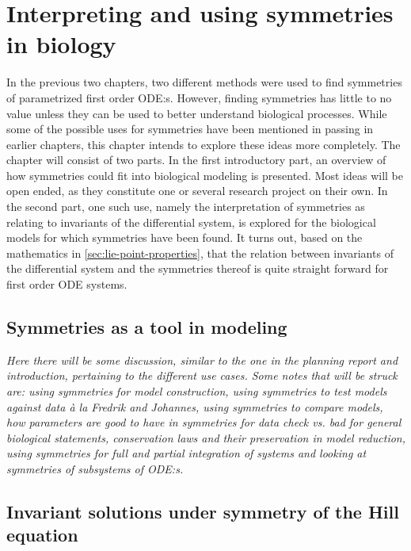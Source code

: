 \chapter{Interpreting and using symmetries in biology} \label{ch:uses}

In the previous two chapters, two different methods were used to find symmetries of parametrized first order ODE:s.
However, finding symmetries has little to no value unless they can be used to better understand biological processes.
While some of the possible uses for symmetries have been mentioned in passing in earlier chapters, this chapter intends to explore these ideas more completely.
The chapter will consist of two parts.
In the first introductory part, an overview of how symmetries could fit into biological modeling is presented.
Most ideas will be open ended, as they constitute one or several research project on their own.
In the second part, one such use, namely the interpretation of symmetries as relating to invariants of the differential system, is explored for the biological models for which symmetries have been found.
It turns out, based on the mathematics in \cref{sec:lie-point-properties}, that the relation between invariants of the differential system and the symmetries thereof is quite straight forward for first order ODE systems.

\section{Symmetries as a tool in modeling} \label{sec:symmetries-as-tool}

\emph{
  Here there will be some discussion, similar to the one in the planning report and introduction, pertaining to the different use cases.
  Some notes that will be struck are: using symmetries for model construction, using symmetries to test models against data à la Fredrik and Johannes, using symmetries to compare models, how parameters are good to have in symmetries for data check vs. bad for general biological statements, conservation laws and their preservation in model reduction, using symmetries for full and partial integration of systems and looking at symmetries of subsystems of ODE:s.
}

\section{Invariant solutions under symmetry of the Hill equation}

